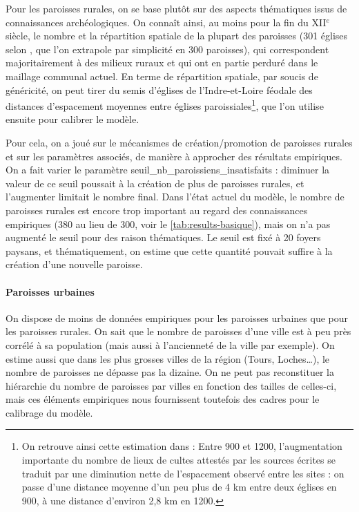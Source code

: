Pour les paroisses \og rurales\fg{}, on se base plutôt sur des aspects thématiques issus de connaissances archéologiques.
On connaît ainsi, au moins pour la fin du XII$^e$ siècle, le nombre et la répartition spatiale de la plupart des paroisses (301 églises selon \textcite[31]{zadora-rio_paroisses_2008}, que l'on extrapole par simplicité en 300 paroisses), qui correspondent majoritairement à des milieux ruraux et qui ont en partie perduré dans le maillage communal actuel.
En terme de répartition spatiale, par soucis de généricité, on peut tirer du semis d'églises de l'Indre-et-Loire féodale des distances d'espacement moyennes entre églises paroissiales\footnote{
	On retrouve ainsi cette estimation dans \textcite[261]{chareille_dynamiques_2008} : \og Entre 900 et 1200, l'augmentation importante du nombre de lieux de cultes attestés par les sources écrites se traduit par une diminution nette de l'espacement observé entre les sites : on passe d'une distance moyenne d'un peu plus de 4 km entre deux églises en 900, à une distance d'environ 2,8 km en 1200.\fg{}
}, que l'on utilise ensuite pour calibrer le modèle.

Pour cela, on a joué sur le mécanismes de création/promotion de paroisses rurales et sur les paramètres associés, de manière à approcher des résultats empiriques.
On a fait varier le paramètre \textsf{seuil\_nb\_paroissiens\_insatisfaits} : diminuer la valeur de ce seuil poussait à la création de plus de paroisses rurales, et l'augmenter limitait le nombre final.
Dans l'état actuel du modèle, le nombre de paroisses rurales est encore trop important au regard des connaissances empiriques (380 au lieu de 300, voir le \vref{tab:results-basique}), mais on n'a pas augmenté le seuil pour des raison thématiques.
Le seuil est fixé à 20 foyers paysans, et thématiquement, on estime que cette quantité pouvait suffire à la création d'une nouvelle paroisse.

\paragraph{Paroisses \og urbaines\fg{}}

On dispose de moins de données empiriques pour les paroisses urbaines que pour les paroisses rurales.
On sait que le nombre de paroisses d'une ville est à peu près corrélé à sa population (mais aussi à l'ancienneté de la ville par exemple).
On estime aussi que dans les plus grosses villes de la région (Tours, Loches\ldots), le nombre de paroisses ne dépasse pas la dizaine.
On ne peut pas reconstituer la hiérarchie du nombre de paroisses par villes en fonction des tailles de celles-ci, mais ces éléments empiriques nous fournissent toutefois des cadres pour le calibrage du modèle.

